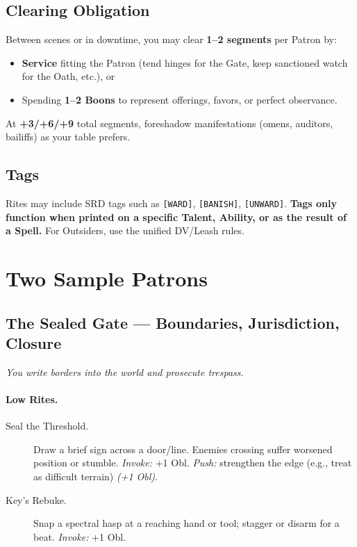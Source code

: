 \subsection{Clearing Obligation}
Between scenes or in downtime, you may clear \textbf{1–2 segments} per Patron by:
\begin{itemize}
  \item \textbf{Service} fitting the Patron (tend hinges for the Gate, keep sanctioned watch for the Oath, etc.), or
  \item Spending \textbf{1–2 Boons} to represent offerings, favors, or perfect observance.
\end{itemize}
At \textbf{+3/+6/+9} total segments, foreshadow manifestations (omens, auditors, bailiffs) as your table prefers.

\subsection{Tags}
Rites may include SRD tags such as \texttt{[WARD]}, \texttt{[BANISH]}, \texttt{[UNWARD]}. \textbf{Tags only function when printed on a specific Talent, Ability, or as the result of a Spell.} For Outsiders, use the unified DV/Leash rules.

\section{Two Sample Patrons}

\subsection{The Sealed Gate — Boundaries, Jurisdiction, Closure}
\textit{You write borders into the world and prosecute trespass.}

\paragraph{Low Rites.}
\begin{description}
  \item[Seal the Threshold.] Draw a brief sign across a door/line. Enemies crossing suffer worsened position or stumble. \emph{Invoke:} +1 Obl. \emph{Push:} strengthen the edge (e.g., treat as difficult terrain) \emph{(+1 Obl)}.
  \item[Key's Rebuke.] Snap a spectral hasp at a reaching hand or tool; stagger or disarm for a beat. \emph{Invoke:} +1 Obl.
\end{description}

